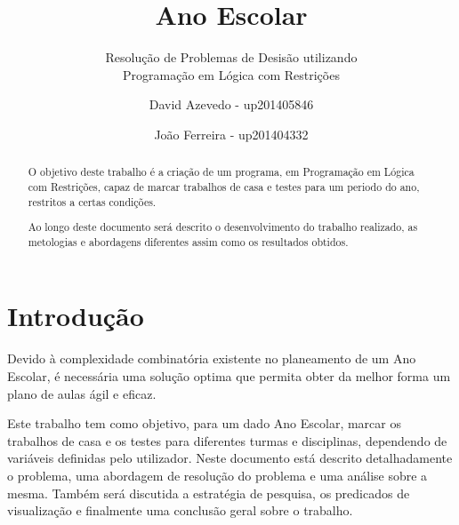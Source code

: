 \documentclass{llncs}
\begin{document}
%
\frontmatter          %
%
\pagestyle{headings}  %
%
\title{Ano Escolar}
\subtitle{Resolução de Problemas de Desisão utilizando\\
Programação em Lógica com Restrições}
%
%
\author{David Azevedo - up201405846 \and João Ferreira - up201404332}
%
%

\maketitle              %

\begin{abstract} %

O objetivo deste trabalho é a criação de um programa, em Programação em Lógica com Restrições, capaz de marcar trabalhos de casa e testes para um periodo do ano, restritos a certas condições.

Ao longo deste documento será descrito o desenvolvimento do trabalho realizado, as metologias e abordagens diferentes assim como os resultados obtidos.

\end{abstract}
%
\section{Introdução}
%
Devido à complexidade combinatória existente no planeamento de um Ano Escolar, é necessária uma solução optima que permita obter da melhor forma um plano de aulas ágil e eficaz.

Este trabalho tem como objetivo, para um dado Ano Escolar, marcar os trabalhos de casa e os testes para diferentes turmas e disciplinas, dependendo de variáveis definidas pelo utilizador.
Neste documento está descrito detalhadamente o problema, uma abordagem de resolução do problema e uma análise sobre a mesma. Também será discutida a estratégia de pesquisa, os predicados de visualização e finalmente uma conclusão geral sobre o trabalho.
\end{document}
